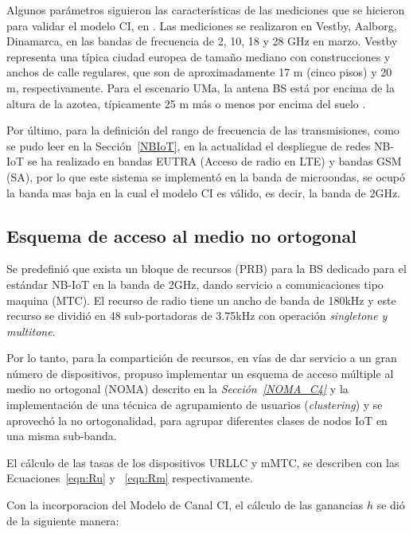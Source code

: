 Algunos parámetros siguieron las características de las mediciones que se hicieron para validar el modelo CI, en \parencite{Sun2016}. Las mediciones se realizaron en Vestby, Aalborg, Dinamarca, en las bandas de frecuencia de 2, 10, 18 y 28 GHz en marzo. Vestby representa una típica ciudad europea de tamaño mediano con construcciones y anchos de calle regulares, que son de aproximadamente 17 m (cinco pisos) y 20 m, respectivamente. Para el escenario UMa, la antena BS está por encima de la altura de la azotea, típicamente 25 m más o menos por encima del suelo \parencite{Sun2016}.\newline

Por último, para la definición del rango de frecuencia de las transmisiones, como se pudo leer en la Sección~\ref{NBIoT}, en la actualidad el despliegue de redes NB-IoT se ha realizado en bandas EUTRA (Acceso de radio en LTE) y bandas GSM (SA), por lo que este sistema se implementó en la banda de microondas, se ocupó la banda mas baja en la cual el modelo CI es válido, es decir, la banda de 2GHz.

\subsection{Esquema de acceso al medio no ortogonal}
Se predefinió que exista un bloque de recursos (PRB) para la BS dedicado para el estándar NB-IoT en la banda de 2GHz, dando servicio a comunicaciones tipo maquina (MTC). El recurso de radio tiene un ancho de banda de 180kHz y este recurso se dividió en 48 sub-portadoras de 3.75kHz con operación \textit{singletone y multitone}.\newline

Por lo tanto, para la compartición de recursos, en vías de dar servicio a un gran número de dispositivos, propuso implementar un esquema de acceso múltiple al medio no ortogonal (NOMA) descrito en la \textit{Sección~\ref{NOMA_C4}} y la implementación de una técnica de agrupamiento de usuarios (\textit{clustering}) y se aprovechó la no ortogonalidad, para agrupar diferentes clases de nodos IoT en una misma sub-banda.\newline

El cálculo de las tasas de los dispositivos URLLC y mMTC, se describen con las Ecuaciones~\ref{eqn:Ru} y ~\ref{eqn:Rm} respectivamente.\newline

Con la incorporacion del Modelo de Canal CI, el cálculo de las ganancias $h$ se dió de la siguiente manera:

